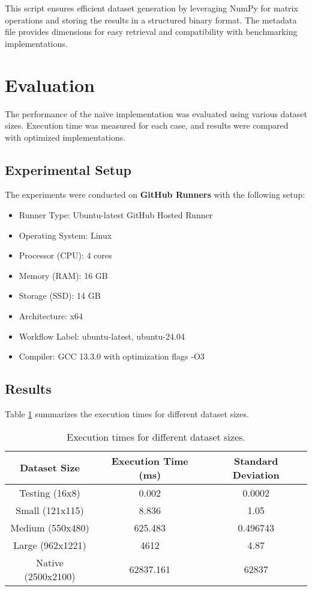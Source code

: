 \documentclass[12pt]{article}
\begin{document}
This script ensures efficient dataset generation by leveraging NumPy for matrix operations and storing the results in a structured binary format. The metadata file provides dimensions for easy retrieval and compatibility with benchmarking implementations.

\section{Evaluation}
The performance of the naïve implementation was evaluated using various dataset sizes. Execution time was measured for each case, and results were compared with optimized implementations.

\subsection{Experimental Setup}
The experiments were conducted on \textbf{GitHub Runners} with the following setup:
\begin{itemize}
    \item Runner Type: Ubuntu-latest GitHub Hosted Runner
    \item Operating System: Linux
    \item Processor (CPU): 4 cores
    \item Memory (RAM): 16 GB
    \item Storage (SSD): 14 GB
    \item Architecture: x64
    \item Workflow Label: ubuntu-latest, ubuntu-24.04
    \item Compiler: GCC 13.3.0 with optimization flags -O3
\end{itemize}

\subsection{Results}
Table \ref{tab:results} summarizes the execution times for different dataset sizes.

\begin{table}[h]
    \begin{tabular}{|c|c|c|}
        \hline
        \textbf{Dataset Size} & \textbf{Execution Time (ms)} & \textbf{Standard Deviation} \\
        \hline
        Testing (16x8) & 0.002 & 0.0002 \\
        Small (121x115) & 8.836 & 1.05 \\
        Medium (550x480) & 625.483 & 0.496743 \\
        Large (962x1221) & 4612 & 4.87 \\
        Native (2500x2100) & 62837.161 &62837 \\
        \hline
    \end{tabular}
        \caption{Execution times for different dataset sizes.}
        \label{tab:results}
    \end{table}
\end{document}
